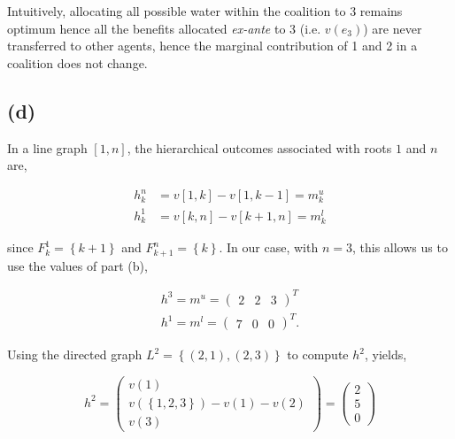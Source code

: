 \documentclass[american]{scrartcl}
\newcommand{\set}[1]{\left\{#1\right\}}
\begin{document}
Intuitively, allocating all possible water within the coalition to 3 remains optimum hence all the benefits allocated \textit{ex-ante} to 3 (i.e. $v(e_3)$) are never transferred to other agents, hence the marginal contribution of 1 and 2 in a coalition does not change.

\subsection*{(d)}


In a line graph $[1, n]$, the hierarchical outcomes associated with roots $1$ and $n$ are,

\begin{equation}
    \begin{split}
        h^n_k &= v[1, k] - v[1, k - 1] = m^u_k \\
        h^1_k &= v[k, n] - v[k+1, n] = m^l_k
    \end{split}
\end{equation}

since $F^1_k = \set{k + 1}$ and $F^n_{k + 1} = \set{k}$. In our case, with $n = 3$, this allows us to use the values of part (b),

\begin{equation}
    \begin{split}
        h^3 = m^u = \begin{pmatrix}
            2 &
            2 &
            3
        \end{pmatrix}^T \\
        h^1 = m^l = \begin{pmatrix}
            7 &
            0 &
            0
        \end{pmatrix}^T.
    \end{split}
\end{equation}

Using the directed graph $L^2 = \set{(2, 1), (2, 3)}$ to compute $h^2$,  yields,

\begin{equation}
    h^2 = \begin{pmatrix}
        v(1) \\ v(\set{1,2,3}) - v(1) - v(2) \\ v(3)
    \end{pmatrix} = \begin{pmatrix}
        2 \\ 5 \\ 0
    \end{pmatrix}
\end{equation}
\end{document}
